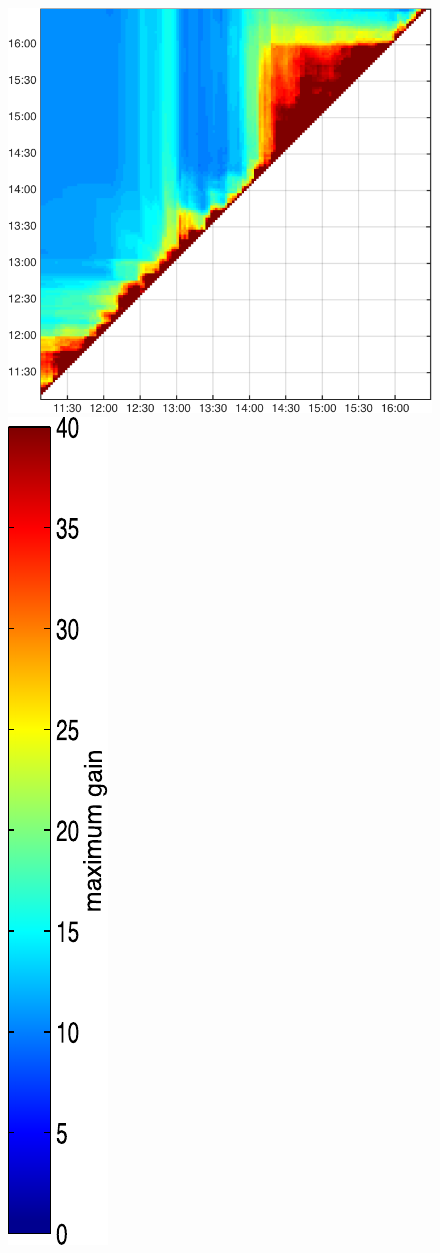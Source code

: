 \begin{figure}
\begin{minipage}[c]{\mylength}
\includegraphics[valign=t,width=\eventswidth]{events/20131111-maxGain-local-events.png}
\includegraphics[valign=t,trim=2pt -8pt 0 5pt,width=\colorbarwidth,totalheight=\eventheight]{events/colorbar-40.pdf}

\end{minipage}
\end{figure}
